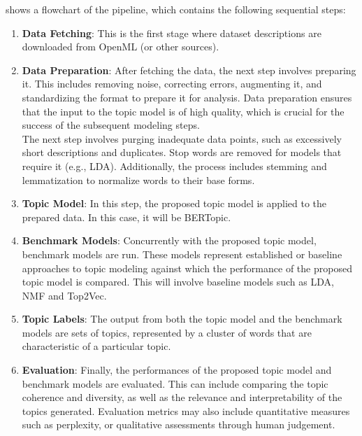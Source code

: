 \documentclass{article}
\begin{document}
 shows a flowchart of the pipeline, which contains the following sequential steps:

\begin{enumerate}

    \item \textbf{Data Fetching}: This is the first stage where dataset descriptions are downloaded from OpenML (or other sources).

    \item \textbf{Data Preparation}: After fetching the data, the next step involves preparing it. This includes removing noise, correcting errors, augmenting it, and standardizing the format to prepare it for analysis. Data preparation ensures that the input to the topic model is of high quality, which is crucial for the success of the subsequent modeling steps. \\ The next step involves purging inadequate data points, such as excessively short descriptions and duplicates. Stop words are removed for models that require it (e.g., LDA). Additionally, the process includes stemming and lemmatization to normalize words to their base forms.

    \item \textbf{Topic Model}: In this step, the proposed topic model is applied to the prepared data. In this case, it will be BERTopic.

    \item \textbf{Benchmark Models}: Concurrently with the proposed topic model, benchmark models are run. These models represent established or baseline approaches to topic modeling against which the performance of the proposed topic model is compared. This will involve baseline models such as LDA, NMF and Top2Vec.

    \item \textbf{Topic Labels}: The output from both the topic model and the benchmark models are sets of topics, represented by a cluster of words that are characteristic of a particular topic.

    \item \textbf{Evaluation}: Finally, the performances of the proposed topic model and benchmark models are evaluated. This can include comparing the topic coherence and diversity, as well as the relevance and interpretability of the topics generated. Evaluation metrics may also include quantitative measures such as perplexity, or qualitative assessments through human judgement.

\end{enumerate}
\end{document}
